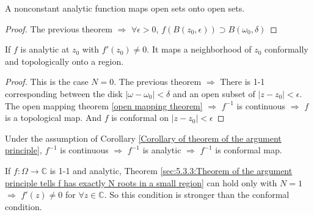 \begin{corollary}\label{open mapping theorem}
    A nonconstant analytic function maps open sets onto open sets.
\end{corollary}
\begin{proof}
    The previous theorem  $ \Rightarrow $ $ \forall \epsilon>0 $,  $ f(B(z_0,\epsilon))\supset B(\omega_0,\delta) $   
\end{proof}
\begin{corollary}\label{Corollary of theorem of the argument principle}
    If  $ f $ is analytic at  $ z_0 $ with  $ f'(z_0)\neq 0 $. It maps a neighborhood of  $ z_0 $ conformally and topologically onto a region.   
\end{corollary}
\begin{proof}
    This is the case  $ N=0 $. The previous theorem  $ \Rightarrow  $ There is 1-1 corresponding between the disk  $ |\omega-\omega_0|<\delta $ and an open subset of  $ |z-z_0|<\epsilon $. The open mapping theorem \ref{open mapping theorem} $ \Rightarrow $  $ f^{-1} $ is continuous  $ \Rightarrow  $ $ f $ is a topological map. And  
    $ f $ is conformal  on  $ |z-z_0|<\epsilon $ 
\end{proof}
\begin{remark}
    Under the assumption of Corollary \ref{Corollary of theorem of the argument principle},  $ f^{-1} $ is continuous  $ \Rightarrow  $ $ f^{-1} $ is analytic $ \Rightarrow $ $ f^{-1} $ is conformal map.  
    
    If  $ f:\Omega\rightarrow \mathbb{C} $ is 1-1 and analytic,  Theorem \ref{sec:5.3.3:Theorem of the argument principle tells f has exactly N roots in a small region} can hold only with  $ N=1 $ $ \Rightarrow $ $ f'(z)\neq 0 $ for  $ \forall z\in\mathbb{C} $. So this condition is stronger than the conformal condition.    
\end{remark}
